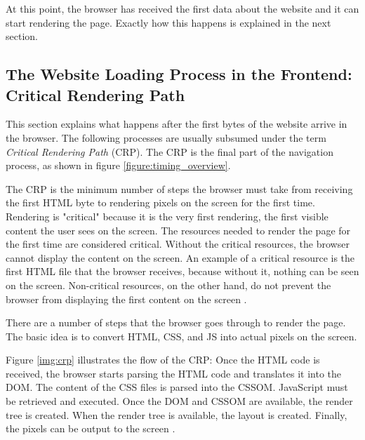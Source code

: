 
At this point, the browser has received the first data about the website and it can start rendering the page.
Exactly how this happens is explained in the next section.




\subsection{The Website Loading Process in the Frontend: Critical Rendering Path} %
\label{subsection:crp}

This section explains what happens after the first bytes of the website arrive in the browser.
The following processes are usually subsumed under the term \textit{Critical Rendering Path} (CRP).
The CRP is the final part of the navigation process, as shown in figure \ref{figure:timing_overview}.



The CRP is the minimum number of steps the browser must take from receiving the first HTML byte to rendering pixels on the screen for the first time.
Rendering is "critical" because it is the very first rendering, the first visible content the user sees on the screen.
The resources needed to render the page for the first time are considered critical.
Without the critical resources, the browser cannot display the content on the screen.
An example of a critical resource is the first HTML file that the browser receives, because without it, nothing can be seen on the screen.
Non-critical resources, on the other hand, do not prevent the browser from displaying the first content on the screen \cite{2018Johnson}.



There are a number of steps that the browser goes through to render the page.
The basic idea is to convert HTML, CSS, and JS into actual pixels on the screen.

Figure \ref{img:crp} illustrates the flow of the CRP:
Once the HTML code is received, the browser starts parsing the HTML code and translates it into the DOM.
The content of the CSS files is parsed into the CSSOM.
JavaScript must be retrieved and executed.
Once the DOM and CSSOM are available, the render tree is created.
When the render tree is available, the layout is created.
Finally, the pixels can be output to the screen \cite{2021MDNCRP}.


